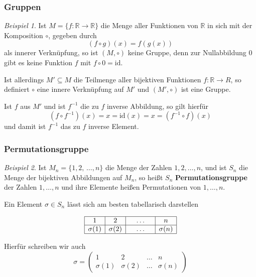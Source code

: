 \documentclass[hyperref={pdfpagelabels=false}]{beamer}
\theoremstyle{plain}%
\theoremstyle{definition}
\theoremstyle{remark}
\newtheorem*{beispiel}{Beispiel}
\def \R{\mathbb R}
\begin{document}
\begin{frame}
\frametitle{Gruppen}

\begin{beispiel} Ist $M = \{f: \mathbb R \longrightarrow \mathbb R \}$ die Menge aller Funktionen 
von $\R$ in sich mit der Komposition $\circ$, gegeben durch 
 	$$ (f \circ g)(x) = f(g(x)) $$
als innerer Verknüpfung, so ist $(M, \circ)$ keine Gruppe, denn zur Nullabbildung $0$ gibt es keine 
Funktion $f$ mit $f\circ 0 = \mathrm{id}$. 

\pause 

Ist allerdings $M' \subseteq M$ die Teilmenge aller bijektiven Funktionen $f: \R \longrightarrow R$, so 
definiert $\circ$ eine innere Verknüpfung auf $M'$ und $(M', \circ)$ ist eine Gruppe. 

\pause 

Ist $f$ aus $M'$ und ist $f^{-1}$ die zu $f$ inverse Abbildung, so gilt hierfür 
	$$ (f \circ f^{-1})(x) = x = \mathrm{id}(x) = x = (f^{-1} \circ f)(x) $$
und damit ist $f^{-1}$ das zu $f$ inverse Element.
\end{beispiel}

\end{frame}

\begin{frame}
\frametitle{Permutationsgruppe}

\begin{beispiel}  
Ist $M_n = \{1, 2, \, \ldots , n \}$ die Menge der Zahlen $1, 2, \ldots, n$, und ist $S_n$ die Menge der 
bijektiven Abbildungen auf $M_n$, so heißt 
$S_n$ \textbf{Permutationsgruppe} der Zahlen $1,  
\ldots, n$ und ihre Elemente heißen Permutationen von $1, \ldots, n$. 

\pause
Ein Element $\sigma \in S_n$ lässt sich am besten tabellarisch darstellen

\medbreak

	$$ \begin{array}{ | c | c | c | c | }
	\hline
	1 & 2 & \quad \ldots \quad & n  \\
	\hline
	\sigma(1) & \sigma(2) & \quad \ldots  \quad & \sigma(n)  \\
	\hline
	\end{array} $$

\pause
\medbreak

Hierfür schreiben wir auch 
  	$$ \sigma = \left( \begin{matrix} 1 & 2 & \ldots & n \\ \sigma(1) & \sigma(2) & \ldots & \sigma(n) 
   	\end{matrix} \right) $$
\end{beispiel}
\end{frame}
\end{document}

